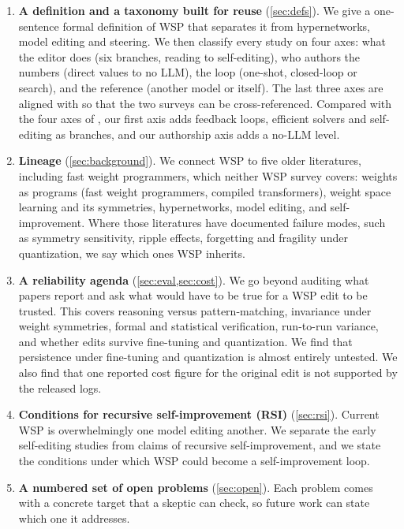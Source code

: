 \begin{enumerate}[leftmargin=*,itemsep=3pt]
\item \textbf{A definition and a taxonomy built for reuse} (\cref{sec:defs}). We give a one-sentence formal definition of WSP that separates it from hypernetworks, model editing and steering. We then classify every study on four axes: what the editor does (six branches, reading to self-editing), who authors the numbers (direct values to no LLM), the loop (one-shot, closed-loop or search), and the reference (another model or itself). The last three axes are aligned with \citet{turkoglu2026survey} so that the two surveys can be cross-referenced. Compared with the four axes of \citet{turkoglu2026survey}, our first axis adds feedback loops, efficient solvers and self-editing as branches, and our authorship axis adds a no-LLM level.
\item \textbf{Lineage} (\cref{sec:background}). We connect WSP to five older literatures, including fast weight programmers, which neither WSP survey covers: weights as programs (fast weight programmers, compiled transformers), weight space learning and its symmetries, hypernetworks, model editing, and self-improvement. Where those literatures have documented failure modes, such as symmetry sensitivity, ripple effects, forgetting and fragility under quantization, we say which ones WSP inherits.
\item \textbf{A reliability agenda} (\cref{sec:eval,sec:cost}). We go beyond auditing what papers report and ask what would have to be true for a WSP edit to be trusted. This covers reasoning versus pattern-matching, invariance under weight symmetries, formal and statistical verification, run-to-run variance, and whether edits survive fine-tuning and quantization. We find that persistence under fine-tuning and quantization is almost entirely untested. We also find that one reported cost figure for the original edit is not supported by the released logs.
\item \textbf{Conditions for recursive self-improvement (RSI)} (\cref{sec:rsi}). Current WSP is overwhelmingly one model editing another. We separate the early self-editing studies from claims of recursive self-improvement, and we state the conditions under which WSP could become a self-improvement loop.
\item \textbf{A numbered set of open problems} (\cref{sec:open}). Each problem comes with a concrete target that a skeptic can check, so future work can state which one it addresses.
\end{enumerate}

